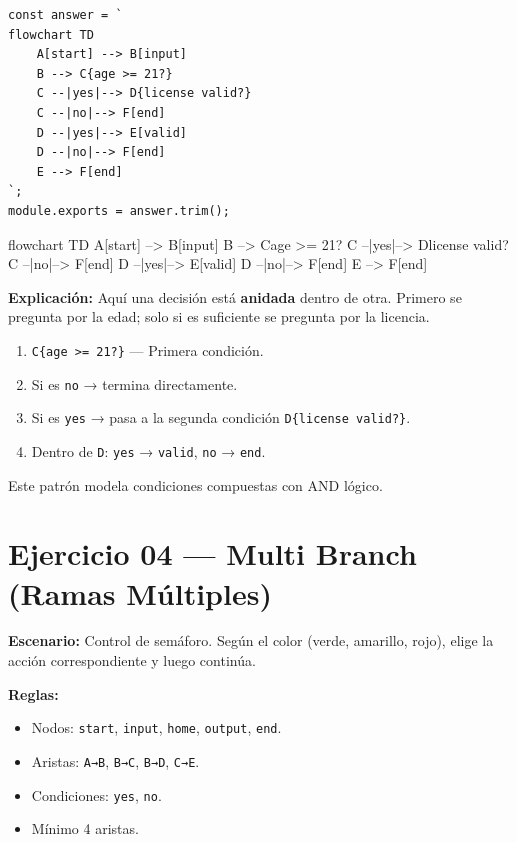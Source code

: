 \documentclass[10pt,a4paper]{article}
\newenvironment{mermaid}[1][]
  {%
   \begin{mdframed}[%
     linecolor=blue!50!black,
     backgroundcolor=blue!3,
     innertopmargin=6pt,
     innerbottommargin=6pt,
     leftmargin=0pt,
     rightmargin=0pt,
     skipabove=10pt,
     skipbelow=10pt,
     frametitle={Diagrama Mermaid},
     frametitlefont={\small\bfseries\color{blue!70!black}},
   ]%
   \small\ttfamily
  }
  {%
   \end{mdframed}%
  }
\begin{document}
\begin{lstlisting}[style=jsstyle]
const answer = `
flowchart TD
    A[start] --> B[input]
    B --> C{age >= 21?}
    C --|yes|--> D{license valid?}
    C --|no|--> F[end]
    D --|yes|--> E[valid]
    D --|no|--> F[end]
    E --> F[end]
`;
module.exports = answer.trim();
\end{lstlisting}

\begin{mermaid}
flowchart TD
    A[start] --> B[input]
    B --> C{age >= 21?}
    C --|yes|--> D{license valid?}
    C --|no|--> F[end]
    D --|yes|--> E[valid]
    D --|no|--> F[end]
    E --> F[end]
\end{mermaid}

\textbf{Explicación:}
Aquí una decisión está \textbf{anidada} dentro de otra. Primero se
pregunta por la edad; solo si es suficiente se pregunta por la licencia.
\begin{enumerate}
  \item \texttt{C\{age >= 21?\}} — Primera condición.
  \item Si es \texttt{no} → termina directamente.
  \item Si es \texttt{yes} → pasa a la segunda condición
        \texttt{D\{license valid?\}}.
  \item Dentro de \texttt{D}: \texttt{yes} → \texttt{valid},
        \texttt{no} → \texttt{end}.
\end{enumerate}
Este patrón modela condiciones compuestas con AND lógico.

\newpage

\section{Ejercicio 04 — Multi Branch (Ramas Múltiples)}

\textbf{Escenario:} Control de semáforo. Según el color (verde,
amarillo, rojo), elige la acción correspondiente y luego continúa.

\textbf{Reglas:}
\begin{itemize}
  \item Nodos: \texttt{start}, \texttt{input}, \texttt{home},
        \texttt{output}, \texttt{end}.
  \item Aristas: \texttt{A→B}, \texttt{B→C}, \texttt{B→D},
        \texttt{C→E}.
  \item Condiciones: \texttt{yes}, \texttt{no}.
  \item Mínimo 4 aristas.
\end{itemize}
\end{document}
